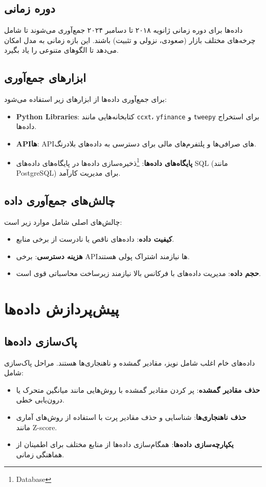\subsection{دوره زمانی}
داده‌ها برای دوره زمانی ژانویه ۲۰۱۸ تا دسامبر ۲۰۲۴ جمع‌آوری می‌شوند تا شامل چرخه‌های مختلف بازار (صعودی، نزولی و تثبیت) باشند. این بازه زمانی به مدل امکان می‌دهد تا الگوهای متنوعی را یاد بگیرد.

\subsection{ابزارهای جمع‌آوری}
برای جمع‌آوری داده‌ها از ابزارهای زیر استفاده می‌شود:
\begin{itemize}
	\item \textbf{Python Libraries}: کتابخانه‌هایی مانند \texttt{ccxt}، \texttt{yfinance} و \texttt{tweepy} برای استخراج داده‌ها.
	\item \textbf{APIها}: APIهای صرافی‌ها و پلتفرم‌های مالی برای دسترسی به داده‌های بلادرنگ.
	\item \textbf{پایگاه‌های داده‌ها}: \footnote{Database}ذخیره‌سازی داده‌ها در پایگاه‌های داده‌های SQL (مانند PostgreSQL) برای مدیریت کارآمد.
\end{itemize}


\subsection{چالش‌های جمع‌آوری داده}
چالش‌های اصلی شامل موارد زیر است:
\begin{itemize}
	\item \textbf{کیفیت داده}: داده‌های ناقص یا نادرست از برخی منابع.
	\item \textbf{هزینه دسترسی}: برخی APIها نیازمند اشتراک پولی هستند.
	\item \textbf{حجم داده}: مدیریت داده‌های با فرکانس بالا نیازمند زیرساخت محاسباتی قوی است.
\end{itemize}

\section{پیش‌پردازش داده‌ها}
\label{sec:data_preprocessing}

\subsection{پاک‌سازی داده‌ها}
داده‌های خام اغلب شامل نویز، مقادیر گمشده و ناهنجاری‌ها هستند. مراحل پاک‌سازی شامل:
\begin{itemize}
	\item \textbf{حذف مقادیر گمشده}: پر کردن مقادیر گمشده با روش‌هایی مانند میانگین متحرک یا درون‌یابی خطی.
	\item \textbf{حذف ناهنجاری‌ها}: شناسایی و حذف مقادیر پرت با استفاده از روش‌های آماری مانند Z-score.
	\item \textbf{یکپارچه‌سازی داده‌ها}: همگام‌سازی داده‌ها از منابع مختلف برای اطمینان از هماهنگی زمانی.
\end{itemize}

